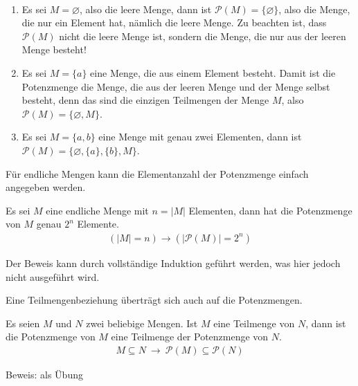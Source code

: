\begin{Unit}[Beispiel] \ 
\begin{enumerate}
  \item Es sei $M = \varnothing$, also die leere Menge, dann ist 
    $\mathcal{P}(M) = \{\varnothing\}$, also die Menge, die nur ein Element 
    hat, nämlich die leere Menge. Zu beachten ist, dass $\mathcal{P}(M)$ nicht 
    die leere Menge ist, sondern die Menge, die nur aus der leeren Menge 
    besteht!

  \item Es sei $M = \{a\}$ eine Menge, die aus einem Element besteht. Damit 
    ist die Potenzmenge die Menge, die aus der leeren Menge und der Menge 
    selbst besteht, denn das sind die einzigen Teilmengen der Menge $M$, also 
    $\mathcal{P}(M) = \{ \varnothing, M \}$.

  \item Es sei $M = \{a, b\}$ eine Menge mit genau zwei Elementen, dann ist 
    $\mathcal{P}(M) = \{ \varnothing, \{a\}, \{b\}, M \}$.
\end{enumerate}
\end{Unit}

\begin{Unit}[Bemerkung]
Für endliche Mengen kann die Elementanzahl der Potenzmenge einfach angegeben
werden.

\begin{Bemerkung}
  Es sei $M$ eine endliche Menge mit $n = |M|$ Elementen, dann hat die 
  Potenzmenge von $M$ genau $2^n$ Elemente.
  \begin{align}
    ( |M| = n ) \rightarrow ( |\mathcal{P}(M)| = 2^n )
  \end{align}
\end{Bemerkung}

Der Beweis kann durch vollständige Induktion geführt werden, was hier jedoch 
nicht ausgeführt wird.
\end{Unit}

\begin{Unit}[Bemerkung]
Eine Teilmengenbeziehung überträgt sich auch auf die Potenzmengen.

\begin{Bemerkung}
  Es seien $M$ und $N$ zwei beliebige Mengen. Ist $M$ eine Teilmenge von $N$, 
  dann ist die Potenzmenge von $M$ eine Teilmenge der Potenzmenge von $N$.
  \begin{align}
    M \subseteq N\ \rightarrow\ \mathcal{P}(M) \subseteq \mathcal{P}(N) 
  \end{align}
\end{Bemerkung}
Beweis: als Übung
\end{Unit}

